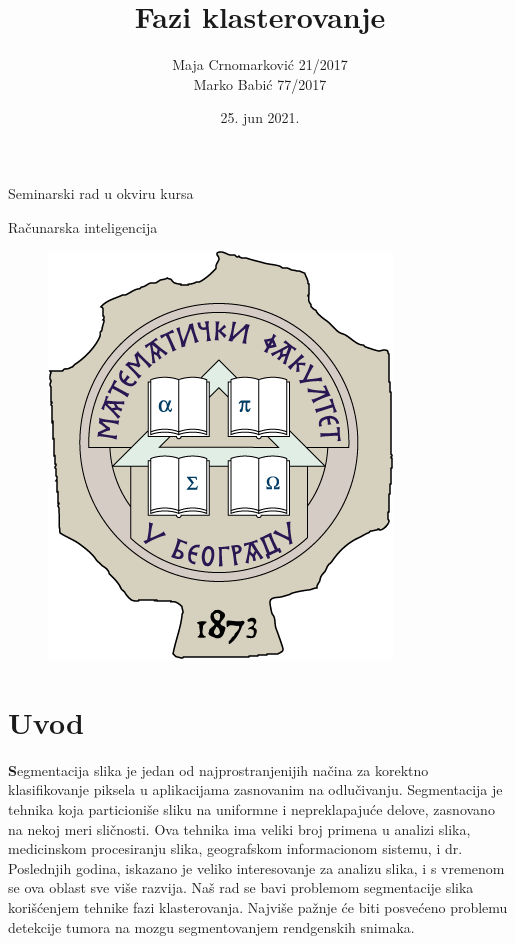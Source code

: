 \documentclass{article}
\begin{document}
\selectfont

\title{{\huge Fazi klasterovanje}}

\author{Maja Crnomarkovi\'{c} 21/2017\\Marko Babi\'{c} 77/2017}
\date{25. jun 2021.}

\maketitle

\centerline{{\normalsize Seminarski rad u okviru kursa}}
\centerline{{\normalsize Ra\v{c}unarska inteligencija}}

\begin{figure}[h]
\vspace{1cm}
\centerline{\includegraphics[scale=0.5]{images/grb.png}}
\end{figure}

\newpage

\renewcommand*\contentsname{\fontencoding{OT2}\selectfont Sadr\v{z}aj}

\tableofcontents

\newpage

\section{\selectfont Uvod}
\textbf Segmentacija slika je jedan od najprostranjenijih na\v{c}ina za korektno klasifikovanje piksela u aplikacijama zasnovanim na odlu\v{c}ivanju. Segmentacija je tehnika koja particioni\v{s}e sliku na uniformne i nepreklapaju\'{c}e delove, zasnovano na nekoj meri sli\v{c}nosti. Ova tehnika ima veliki broj primena u analizi slika, medicinskom procesiranju slika, geografskom informacionom sistemu, i dr. Poslednjih godina, iskazano je veliko interesovanje za analizu slika, i s vremenom se ova oblast sve vi\v{s}e razvija. Na\v{s} rad se bavi problemom segmentacije slika kori\v{s}\'{c}enjem tehnike fazi klasterovanja. Najvi\v{s}e pa\v{z}nje \'{c}e biti posve\'{c}eno problemu detekcije tumora na mozgu segmentovanjem rendgenskih snimaka.
\end{document}
